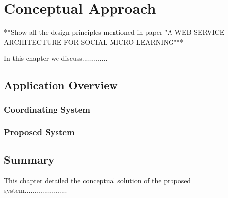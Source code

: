 \chapter{Conceptual Approach}
\label{cha:conceptanddesign}

**Show all the design principles mentioned in paper "A WEB SERVICE 
ARCHITECTURE FOR SOCIAL MICRO-LEARNING"**


In this chapter we discuss.............

\section{Application Overview}


\subsection{Coordinating System}


\subsection{Proposed System}


\section{Summary}

This chapter detailed the conceptual solution of the proposed system......................
